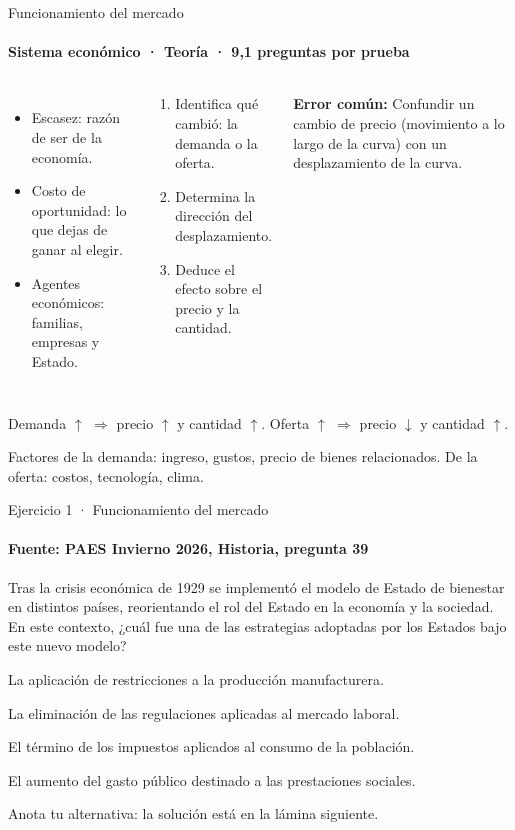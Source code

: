 \documentclass[aspectratio=169,11pt]{beamer}
\newcommand{\alternativa}[2]{\begin{opcion}\tecla{#1}\hspace{0.6em}#2\end{opcion}}
\newlength{\ajustealto}
\newenvironment{ajustar}[1][0.74\textheight]
  {\setlength{\ajustealto}{#1}\begin{lrbox}{\ajustecaja}\begin{minipage}{\textwidth}}
  {\end{minipage}\end{lrbox}%
   \ifdim\dimexpr\ht\ajustecaja+\dp\ajustecaja\relax>\ajustealto
     \resizebox*{!}{\ajustealto}{\usebox{\ajustecaja}}\else\usebox{\ajustecaja}\fi}
\begin{document}
\begin{frame}{Funcionamiento del mercado}
\label{tema-hi-mercado}
\framesubtitle{Sistema económico · Teoría · 9,1 preguntas por prueba}
\begin{ajustar}
\begin{columns}[T,onlytextwidth]
\begin{itemize}\footnotesize
\item Escasez: razón de ser de la economía.
\item Costo de oportunidad: lo que dejas de ganar al elegir.
\item Agentes económicos: familias, empresas y Estado.
\end{itemize}
\begin{cajaregla}\scriptsize \begin{enumerate}\item Identifica qué cambió: la demanda o la oferta.\item Determina la dirección del desplazamiento.\item Deduce el efecto sobre el precio y la cantidad.\end{enumerate}\end{cajaregla}
\begin{notagris}\scriptsize \textbf{Error común:} Confundir un cambio de precio (movimiento a lo largo de la curva) con un desplazamiento de la curva.\end{notagris}
\end{columns}
\begin{cajaclave}[Desplazamientos]\footnotesize
Demanda $\uparrow$ $\Rightarrow$ precio $\uparrow$ y cantidad $\uparrow$. Oferta $\uparrow$ $\Rightarrow$ precio $\downarrow$ y cantidad $\uparrow$.

Factores de la demanda: ingreso, gustos, precio de bienes relacionados. De la oferta: costos, tecnología, clima.
\end{cajaclave}
\end{ajustar}
\end{frame}

\begin{frame}{Ejercicio 1 · Funcionamiento del mercado}
\framesubtitle{Fuente: PAES Invierno 2026, Historia, pregunta 39}
\begin{ajustar}[0.7\textheight]
{\small Tras la crisis económica de 1929 se implementó el modelo de Estado de bienestar en distintos países, reorientando el rol del Estado en la economía y la sociedad. En este contexto, ¿cuál fue una de las estrategias adoptadas por los Estados bajo este nuevo modelo?}
\vspace{0.4em}
\alternativa{A}{La aplicación de restricciones a la producción manufacturera.}
\alternativa{B}{La eliminación de las regulaciones aplicadas al mercado laboral.}
\alternativa{C}{El término de los impuestos aplicados al consumo de la población.}
\alternativa{D}{El aumento del gasto público destinado a las prestaciones sociales.}
\end{ajustar}
\vfill{\tiny\color{zinc500}\hfill Anota tu alternativa: la solución está en la lámina siguiente.}
\end{frame}
\end{document}
